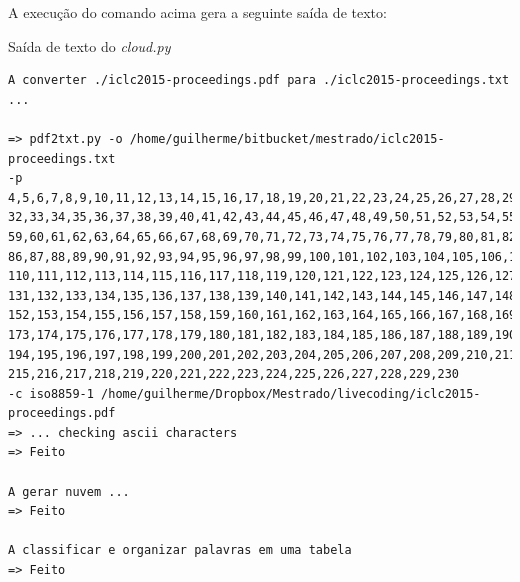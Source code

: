 A execução do comando acima gera a seguinte saída de texto:

\begin{example}{Saída de texto do \emph{cloud.py}}
\begin{verbatim}
A converter ./iclc2015-proceedings.pdf para ./iclc2015-proceedings.txt  ... 

=> pdf2txt.py -o /home/guilherme/bitbucket/mestrado/iclc2015-proceedings.txt 
-p 4,5,6,7,8,9,10,11,12,13,14,15,16,17,18,19,20,21,22,23,24,25,26,27,28,29,30,31,
32,33,34,35,36,37,38,39,40,41,42,43,44,45,46,47,48,49,50,51,52,53,54,55,56,57,58,
59,60,61,62,63,64,65,66,67,68,69,70,71,72,73,74,75,76,77,78,79,80,81,82,83,84,85,
86,87,88,89,90,91,92,93,94,95,96,97,98,99,100,101,102,103,104,105,106,107,108,109,
110,111,112,113,114,115,116,117,118,119,120,121,122,123,124,125,126,127,128,129,130,
131,132,133,134,135,136,137,138,139,140,141,142,143,144,145,146,147,148,149,150,151,
152,153,154,155,156,157,158,159,160,161,162,163,164,165,166,167,168,169,170,171,172,
173,174,175,176,177,178,179,180,181,182,183,184,185,186,187,188,189,190,191,192,193,
194,195,196,197,198,199,200,201,202,203,204,205,206,207,208,209,210,211,212,213,214,
215,216,217,218,219,220,221,222,223,224,225,226,227,228,229,230 
-c iso8859-1 /home/guilherme/Dropbox/Mestrado/livecoding/iclc2015-proceedings.pdf
=> ... checking ascii characters
=> Feito

A gerar nuvem ...
=> Feito

A classificar e organizar palavras em uma tabela
=> Feito
\end{verbatim}
\end{example}

\newpage

